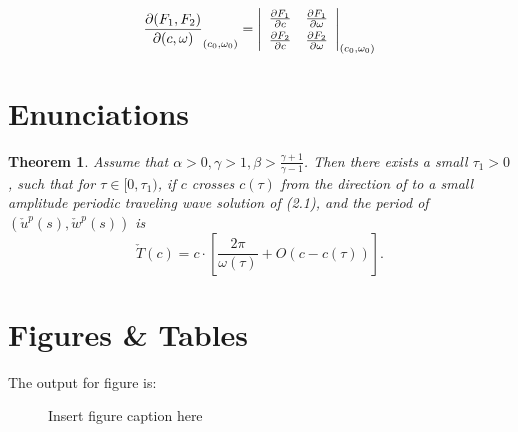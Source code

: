 \documentclass{cta-author}%
\newtheorem{theorem}{Theorem}{}
\begin{document}
\[
\frac{\partial(F_1,F_2)}{\partial(c,\omega)}_{(c_0,\omega_0)} = \left|
\begin{array}{ll}
\frac{\partial F_1}{\partial c} &\frac{\partial F_1}{\partial \omega} \\\noalign{\vskip3pt}
\frac{\partial F_2}{\partial c}&\frac{\partial F_2}{\partial \omega}
\end{array}\right|_{(c_0,\omega_0)}
\]

\section{Enunciations}





\begin{theorem}\label{T0.1}
Assume that $\alpha>0, \gamma>1, \beta>\frac{\gamma+1}{\gamma-1}$.
Then there exists a small $\tau_1>0$, such that for $\tau\in
[0,\tau_1)$, if $c$ crosses $c(\tau)$ from the direction of
to  a small amplitude periodic traveling wave solution of
(2.1), and the period of $(\check{u}^p(s),\check{w}^p(s))$ is
\[
\check{T}(c)=c\cdot \left[\frac{2\pi}{\omega(\tau)}+O(c-c(\tau))\right].
\]
\end{theorem}


\section{Figures \& Tables}

The output for figure is:

\begin{figure}[!h]
\caption{Insert figure caption here}
\label{fig_sim}
\end{figure}
\end{document}
